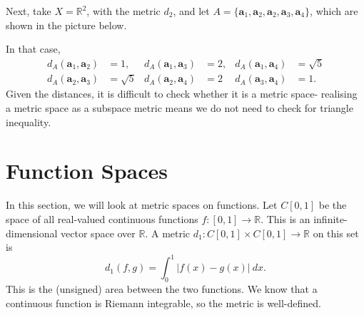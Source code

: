 \documentclass[a4paper, openany]{memoir}
\theoremstyle{definition}
\theoremstyle{plain}
\begin{document}
Next, take $X = \mathbb{R}^2$, with the metric $d_2$, and let $A = \{\bm{a}_1, \bm{a}_2, \bm{a}_2, \bm{a}_3, \bm{a}_4\}$, which are shown in the picture below.
\begin{figure}[H]
    \centering
\end{figure}
\noindent In that case,
\begin{align*}
    d_A(\bm{a}_1, \bm{a}_2) &= 1, & d_A(\bm{a}_1, \bm{a}_3) &= 2, & d_A(\bm{a}_1, \bm{a}_4) &= \sqrt{5} \\
    d_A(\bm{a}_2, \bm{a}_3) &= \sqrt{5} & d_A(\bm{a}_2, \bm{a}_4) &= 2 & d_A(\bm{a}_3, \bm{a}_4) &= 1.
\end{align*}
Given the distances, it is difficult to check whether it is a metric space- realising a metric space as a subspace metric means we do not need to check for triangle inequality.
\newpage

\section{Function Spaces}
In this section, we will look at metric spaces on functions. Let $C[0, 1]$ be the space of all real-valued continuous functions $f: [0, 1] \to \mathbb{R}$. This is an infinite-dimensional vector space over $\mathbb{R}$. A metric $d_1: C[0, 1] \times C[0, 1] \to \mathbb{R}$ on this set is
\[d_1(f, g) = \int_0^1\left|f(x) - g(x)\right| \ dx.\]
This is the (unsigned) area between the two functions. We know that a continuous function is Riemann integrable, so the metric is well-defined. 
\end{document}
